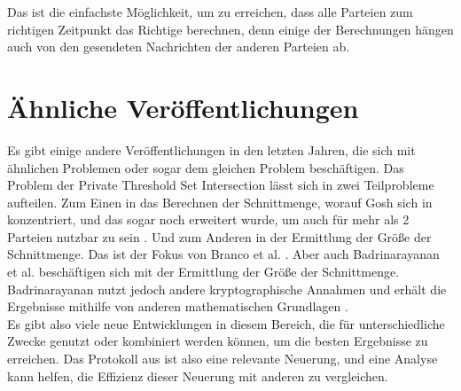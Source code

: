 Das ist die einfachste Möglichkeit, um zu erreichen, dass alle Parteien zum richtigen Zeitpunkt das Richtige berechnen, denn einige der Berechnungen hängen auch von den gesendeten Nachrichten der anderen Parteien ab.\\

\section{Ähnliche Veröffentlichungen}
Es gibt einige andere Veröffentlichungen in den letzten Jahren, die sich mit ähnlichen Problemen oder sogar dem gleichen Problem beschäftigen.
Das Problem der Private Threshold Set Intersection lässt sich in zwei Teilprobleme aufteilen. Zum Einen in das Berechnen der Schnittmenge, worauf Gosh sich in \cite{Ghosh2019} konzentriert, und das sogar noch erweitert wurde, um auch für mehr als 2 Parteien nutzbar zu sein \cite{Doettling2021}. Und zum Anderen in der Ermittlung der Größe der Schnittmenge. Das ist der Fokus von Branco et al.  \cite{Doettling2021}. Aber auch Badrinarayanan et al. \cite{cryptoeprint:2020:600} beschäftigen sich mit der Ermittlung der Größe der Schnittmenge. Badrinarayanan nutzt jedoch andere kryptographische Annahmen und erhält die Ergebnisse mithilfe von anderen mathematischen Grundlagen \cite{Doettling2021}.\\
Es gibt also viele neue Entwicklungen in diesem Bereich, die für unterschiedliche Zwecke genutzt oder kombiniert werden können, um die besten Ergebnisse zu erreichen. Das Protokoll aus \cite{Doettling2021} ist also eine relevante Neuerung, und eine Analyse kann helfen, die Effizienz dieser Neuerung mit anderen zu vergleichen.
